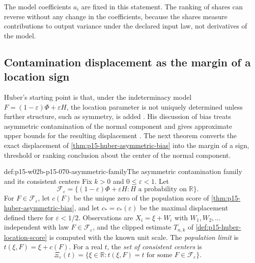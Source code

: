 The model coefficients \(a_i\) are fixed in this statement. The
ranking of shares can reverse without any change in the coefficients,
because the shares measure contributions to output variance under the
declared input law, not derivatives of the model.

\subsection{Contamination displacement as the margin of a location sign}
\label{sec:p15-w02b-p15-070-contamination-margin}

Huber's starting point is that, under the indeterminacy model
\(F=(1-\varepsilon)\Phi+\varepsilon H\), the location parameter is not
uniquely determined unless further structure, such as symmetry, is added
\cite[Sec.~1, p.~73]{Huber1964RobustLocation}. His discussion of bias
treats asymmetric contamination of the normal component and gives
approximate upper bounds for the resulting displacement
\cite[Sec.~7, pp.~82--83]{Huber1964RobustLocation}. The next theorem
converts the exact displacement of
\cref{thm:p15-huber-asymmetric-bias} into the margin of a sign,
threshold or ranking conclusion about the center of the normal component.

\begin{hbdefinition}{def:p15-w02b-p15-070-asymmetric-family}{The asymmetric contamination family and its consistent centers}
Fix \(k>0\) and \(0\leq\varepsilon<1\). Let
\[
 \mathcal F_\varepsilon
 =\{(1-\varepsilon)\Phi+\varepsilon H:H\text{ a probability on }\mathbb R\}.
\]
For \(F\in\mathcal F_\varepsilon\), let \(c(F)\) be the unique zero of
the population score of \cref{thm:p15-huber-asymmetric-bias}, and let
\(c_*=c_*(\varepsilon)\) be the maximal displacement defined there for
\(\varepsilon<1/2\). Observations are \(X_i=\xi+W_i\) with
\(W_1,W_2,\ldots\) independent with law \(F\in\mathcal F_\varepsilon\),
and the clipped estimate \(T_{n,k}\) of
\cref{def:p15-huber-location-score} is computed with the known unit scale.
The \emph{population limit} is \(t(\xi,F)=\xi+c(F)\). For a real
\(t\), the \emph{set of consistent centers} is
\[
 \Xi_\varepsilon(t)=\{\xi\in\mathbb R:t(\xi,F)=t
                      \text{ for some }F\in\mathcal F_\varepsilon\}.
\]
\end{hbdefinition}

